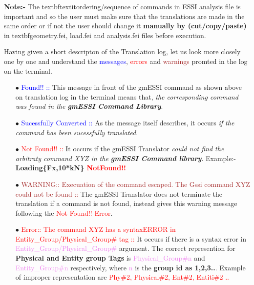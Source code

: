 \documentclass[11pt]{article}
\begin{document}
\textbf{Note:- } The textbf{textit{ordering/sequence of commands in ESSI
analysis file is important}} and so the user must make sure that the
translations are made in the same order or if not the user should change it
\textbf{manually by (cut/copy/paste)} in textbf{geometry.fei, load.fei and
analysis.fei} files before execution.


Having given a short descripton of the Translation log, let us look more
closely one by one and understand the \textcolor{blue}{messages},
\textcolor{red}{errors} and \textcolor{brown}{warnings} promted in the log on
the terminal.

\begin{itemize}

  \item[$\bullet$] \textcolor{blue}{Found!! ::} 
  This message in front of the
  gmESSI  command  as  shown  above on translation log in the terminal means
  that,  \textit{the  corresponding  command was found in the \textbf{gmESSI
  Command Library}}.
  
  \item[$\bullet$]   \textcolor{blue}{  Sucessfully  Converted  ::}  
  As  the
  message  itself  describes,  it  occurs  \textit{if  the  command has been
  sucessfully translated}.
  
  \item[$\bullet$]  \textcolor{red}{Not  Found!! ::} 
  It occurs if the gmESSI
  Translator  \textit{could  not  find  the  arbitraty  command  XYZ  in the
  \textbf{gmESSI  Command  library}}.  Example:- \textbf{Loading\{Fx,10*kN\}
  \textcolor{red}{NotFound!!}}
  
  \item[$\bullet$]  \textcolor{brown}{WARNING::  Execuation  of  the command
  escaped. The Gssi command XYZ could not be found ::} 
  The gmESSI Translator
  does  not  terminate  the  translation  if a command is not found, instead
  gives  this  warning  message  following  the  \textcolor{red}{Not Found!!
  Error}.
  
  \item[$\bullet$] \textcolor{red}{Error:: The command XYZ has a syntaxERROR
  in  Entity\_Group/Physical\_Group\# tag ::} 
  It occurs if there is a syntax error in
  \textcolor{violet}{Entity\_Group/Physical\_Group\#}     argument.    The    correct
  represention    for   \textbf{Physical   and   Entity   group   Tags}   is
  \textcolor{violet}{Physical\_Group\#n}                                 and
  \textcolor{violet}{Entity\_Group\#n}          respectively,          where
  \textcolor{violet}{n}  is  the  \textbf{group  id  as 1,2,3..}. Example of
  improper     representation     are    \textcolor{red}{Phy\#2,
  Physical\#2, Ent\#2, Entiti\#2 ..}
  

\end{itemize}
\end{document}
